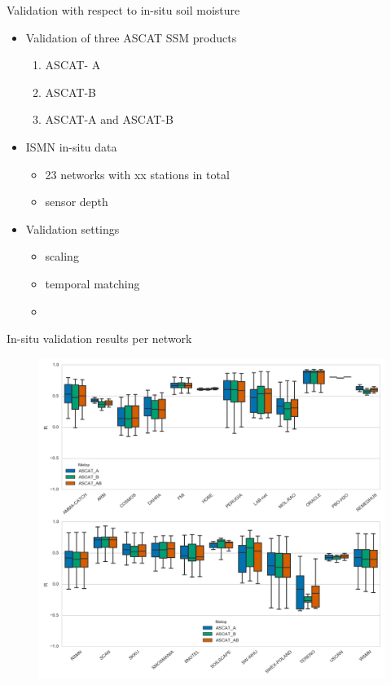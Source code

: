 \documentclass[10pt,ignorenonframetext,xcolor={dvipsnames, table}]{beamer}
\providecommand{\tightlist}{%
\setlength{\itemsep}{0pt}\setlength{\parskip}{0pt}}
\begin{document}
\begin{frame}{Validation with respect to in-situ soil moisture}

\begin{itemize}
\tightlist
\item
  Validation of three ASCAT SSM products

  \begin{enumerate}
  \def\labelenumi{\arabic{enumi}.}
  \tightlist
  \item
    ASCAT- A
  \item
    ASCAT-B
  \item
    ASCAT-A and ASCAT-B
  \end{enumerate}
\item
  ISMN in-situ data

  \begin{itemize}
  \tightlist
  \item
    23 networks with xx stations in total
  \item
    sensor depth
  \end{itemize}
\item
  Validation settings

  \begin{itemize}
  \item
    scaling
  \item
    temporal matching
  \item
  \end{itemize}
\end{itemize}

\end{frame}

\begin{frame}{In-situ validation results per network}

\begin{figure}
\includegraphics[height=0.8\textheight,keepaspectratio]{./figures/boxplot_ISMNnetwork_ASCAT.png}
\end{figure}

\end{frame}
\end{document}
